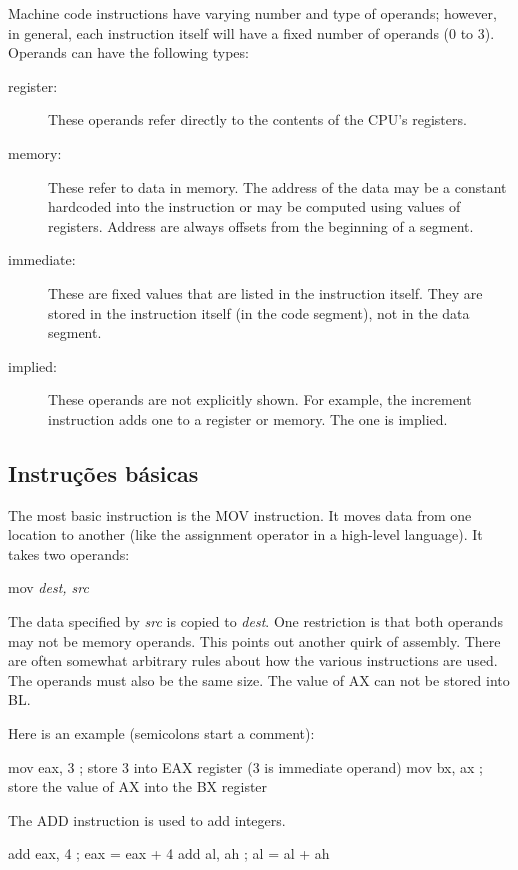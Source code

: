 Machine code instructions have varying number and type of operands; however,
in general, each instruction itself will have a fixed number of operands (0
to 3). Operands can have the following types:
\begin{description}
\item[register:]
These operands refer directly to the contents of the CPU's registers.
\item[memory:]
These refer to data in memory. The address of the data may be a constant
hardcoded into the instruction or may be computed using values of registers.
Address are always offsets from the beginning of a segment.
\item[immediate:]
These are fixed values that are listed in the instruction itself. They are
stored in the instruction itself (in the code segment), not in the data
segment.
\item[implied:]
These operands are not explicitly shown. For example, the increment
instruction adds one to a register or memory. The one is implied.
\end{description}

\subsection{Instruções básicas}

The most basic instruction is the {\code MOV}  instruction. It moves
data from one location to another (like the assignment operator in a
high-level language). It takes two operands:
\begin{CodeQuote}
  mov {\em dest, src}
\end{CodeQuote}
The data specified by {\em src} is copied to {\em dest\/}. One restriction
is that both operands may not be memory operands. This points out another
quirk of assembly. There are often somewhat arbitrary rules about how the
various instructions are used. The operands must also be the same size. The
value of AX can not be stored into BL.

Here is an example (semicolons start a comment):
\begin{AsmCodeListing}[frame=none, numbers=none]
      mov    eax, 3   ; store 3 into EAX register (3 is immediate operand)
      mov    bx, ax   ; store the value of AX into the BX register
\end{AsmCodeListing}

The {\code ADD}  instruction is used to add integers.
\begin{AsmCodeListing}[frame=none, numbers=none]
      add    eax, 4   ; eax = eax + 4
      add    al, ah   ; al = al + ah
\end{AsmCodeListing}

